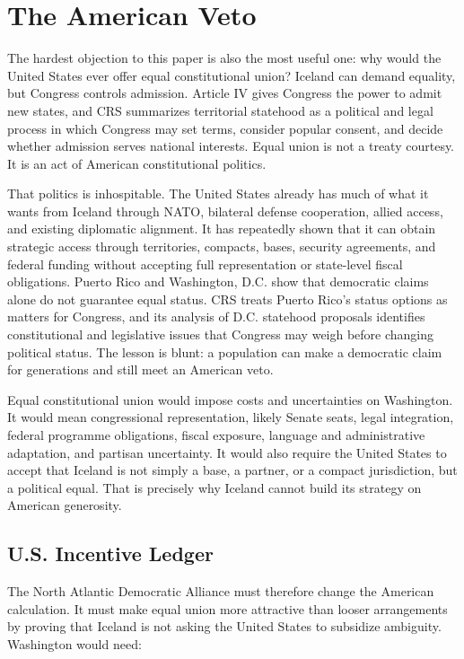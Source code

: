 \documentclass[11pt,a4paper]{article}
\begin{document}
\section{The American Veto}
The hardest objection to this paper is also the most useful one: why would the United States ever offer equal constitutional union? Iceland can demand equality, but Congress controls admission. Article IV gives Congress the power to admit new states, and CRS summarizes territorial statehood as a political and legal process in which Congress may set terms, consider popular consent, and decide whether admission serves national interests.\cite{usconstitution,crsstatehoodprocess} Equal union is not a treaty courtesy. It is an act of American constitutional politics.

That politics is inhospitable. The United States already has much of what it wants from Iceland through NATO, bilateral defense cooperation, allied access, and existing diplomatic alignment. It has repeatedly shown that it can obtain strategic access through territories, compacts, bases, security agreements, and federal funding without accepting full representation or state-level fiscal obligations. Puerto Rico and Washington, D.C. show that democratic claims alone do not guarantee equal status. CRS treats Puerto Rico's status options as matters for Congress, and its analysis of D.C. statehood proposals identifies constitutional and legislative issues that Congress may weigh before changing political status.\cite{crspuertorico,crsdcstatehood} The lesson is blunt: a population can make a democratic claim for generations and still meet an American veto.

Equal constitutional union would impose costs and uncertainties on Washington. It would mean congressional representation, likely Senate seats, legal integration, federal programme obligations, fiscal exposure, language and administrative adaptation, and partisan uncertainty. It would also require the United States to accept that Iceland is not simply a base, a partner, or a compact jurisdiction, but a political equal. That is precisely why Iceland cannot build its strategy on American generosity.

\subsection{U.S. Incentive Ledger}
The North Atlantic Democratic Alliance must therefore change the American calculation. It must make equal union more attractive than looser arrangements by proving that Iceland is not asking the United States to subsidize ambiguity. Washington would need:
\end{document}
